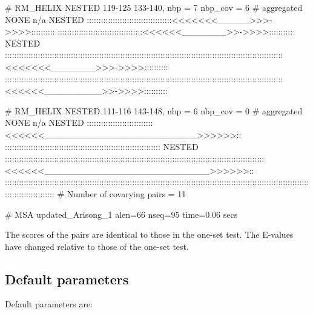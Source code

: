 \begin{sreoutput}
# RM_HELIX NESTED 119-125 133-140, nbp = 7 nbp_cov = 6
# aggregated NONE
n/a
NESTED  ::::::::::::::::::::::::::::::::::::<<<<<<<_____>>>->>>>::::::::::
        ::::::::::::::::::::::::::::::::::::<<<<<<_______>>->>>>::::::::::
NESTED  ::::::::::::::::::::::::::::::::::::::::::::::::::::::::::::::::::::::::::::::::::::::::::::::::::::::::::::::::::::::<<<<<<<_______>>>->>>>::::::::::
        ::::::::::::::::::::::::::::::::::::::::::::::::::::::::::::::::::::::::::::::::::::::::::::::::::::::::::::::::::::::<<<<<<_________>>->>>>::::::::::

# RM_HELIX NESTED 111-116 143-148, nbp = 6 nbp_cov = 0
# aggregated NONE
n/a
NESTED  ::::::::::::::::::::::::::::<<<<<<________________________>>>>>>::
        ::::::::::::::::::::::::::::::::::::::::::::::::::::::::::::::::::
NESTED  ::::::::::::::::::::::::::::::::::::::::::::::::::::::::::::::::::::::::::::::::::::::::::::::::::::::::::::::<<<<<<__________________________>>>>>>::
        ::::::::::::::::::::::::::::::::::::::::::::::::::::::::::::::::::::::::::::::::::::::::::::::::::::::::::::::::::::::::::::::::::::::::::::::::::::::
# Number of covarying pairs = 11

# MSA updated_Arisong_1 alen=66 nseq=95 time=0.06 secs
\end{sreoutput}
The scores of the pairs are identical to those in the one-set
test. The E-values have changed relative to those of the one-set test.


 \subsection{Default parameters}

Default parameters are:

